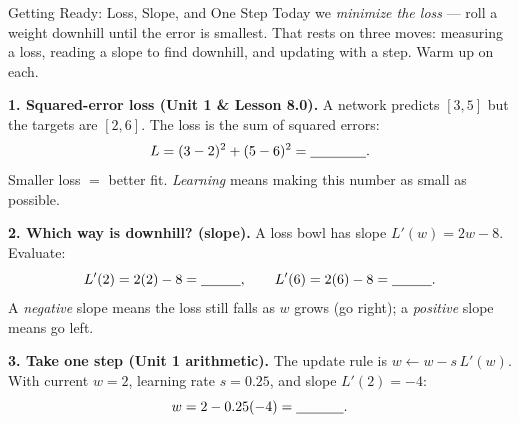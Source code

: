 \documentclass[10pt]{article}
\begin{document}
\namedateperiod

\vspace{0.12in}

\begin{notesbox}{Getting Ready: Loss, Slope, and One Step}
\small Today we \emph{minimize the loss} --- roll a weight downhill until the error is smallest. That rests on
three moves: measuring a loss, reading a slope to find downhill, and updating with a step. Warm up on each.

\vspace{4pt}
\textbf{1. Squared-error loss (Unit 1 \& Lesson 8.0).} A network predicts $[3,5]$ but the targets are $[2,6]$.
The loss is the sum of squared errors:
\[
  L=(3-2)^2+(5-6)^2=\blank{1.4cm}.
\]
Smaller loss $=$ better fit. \emph{Learning} means making this number as small as possible.

\vspace{4pt}
\textbf{2. Which way is downhill? (slope).} A loss bowl has slope $L'(w)=2w-8$. Evaluate:
\[
  L'(2)=2(2)-8=\blank{1.0cm},\qquad L'(6)=2(6)-8=\blank{1.0cm}.
\]
A \emph{negative} slope means the loss still falls as $w$ grows (go right); a \emph{positive} slope means go left.

\vspace{4pt}
\textbf{3. Take one step (Unit 1 arithmetic).} The update rule is $w\leftarrow w-s\,L'(w)$. With current
$w=2$, learning rate $s=0.25$, and slope $L'(2)=-4$:
\[
  w = 2-0.25(-4)=\blank{1.2cm}.
\]
\end{notesbox}
\end{document}
